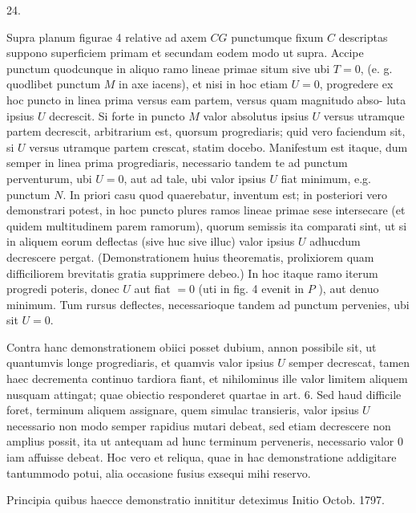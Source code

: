 \documentclass[twoside,12pt, showframe]{memoir}
\begin{document}
24.

Supra planum figurae 4 relative ad axem \(C G\) punctumque fixum \(C\) descriptas suppono superficiem primam et secundam eodem modo ut supra. Accipe punctum quodcunque in aliquo ramo lineae primae situm sive ubi \(T=0\), (e. g. quodlibet punctum \(M\) in axe iacens), et nisi in hoc etiam \(U=0\), progredere ex hoc puncto in linea prima versus eam partem, versus quam magnitudo abso-
luta ipsius \(U\) decrescit. Si forte in puncto \(M\) valor absolutus ipsius \(U\) versus utramque partem decrescit, arbitrarium est, quorsum progrediaris; quid vero faciendum sit, si \(U\) versus utramque partem crescat, statim docebo. Manifestum est itaque, dum semper in linea prima progrediaris, necessario tandem te ad punctum perventurum, ubi \(U=0\), aut ad tale, ubi valor ipsius \(U\) fiat minimum, e.g. punctum \(N\). In priori casu quod quaerebatur, inventum est; in posteriori vero demonstrari potest, in hoc puncto plures ramos lineae primae sese intersecare (et quidem multitudinem parem ramorum), quorum semissis ita comparati sint, ut si in aliquem eorum deflectas (sive huc sive illuc) valor ipsius \(U\) adhucdum decrescere pergat. (Demonstrationem huius theorematis, prolixiorem quam difficiliorem brevitatis gratia supprimere debeo.) In hoc itaque ramo iterum progredi poteris, donec \(U\) aut fiat \(=0\) (uti in fig. 4 evenit in \(P\) ), aut denuo minimum. Tum rursus deflectes, necessarioque tandem ad punctum pervenies, ubi sit \(U=0\).

Contra hanc demonstrationem obiici posset dubium, annon possibile sit, ut quantumvis longe progrediaris, et quamvis valor ipsius \(U\) semper decrescat, tamen haec decrementa continuo tardiora fiant, et nihilominus ille valor limitem aliquem nusquam attingat; quae obiectio responderet quartae in art. 6. Sed haud difficile foret, terminum aliquem assignare, quem simulac transieris, valor ipsius \(U\) necessario non modo semper rapidius mutari debeat, sed etiam decrescere non amplius possit, ita ut antequam ad hunc terminum perveneris, necessario valor 0 iam affuisse debeat. Hoc vero et reliqua, quae in hac demonstratione addigitare tantummodo potui, alia occasione fusius exsequi mihi reservo.

Principia quibus haecce demonstratio innititur deteximus Initio Octob. 1797.

\begin{center}
\end{center}
\end{document}
